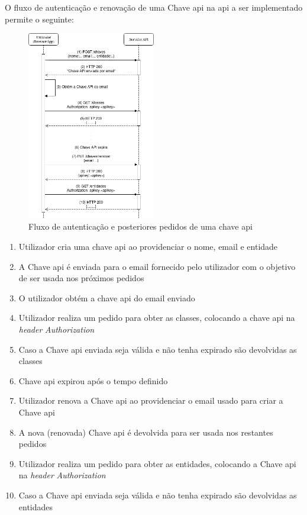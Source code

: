O fluxo de autenticação e renovação de uma Chave \acrshort{api} na \acrshort{api} a ser implementado permite o seguinte:
\begin{figure}[H]
    \centering
    \includegraphics[width=0.5\textwidth]{img/chaveAuth.png}
    \caption{Fluxo de autenticação e posteriores pedidos de uma chave \acrshort{api}}\label{fig:chaveAuth}
\end{figure}

\begin{enumerate}
    \item Utilizador cria uma chave \acrshort{api} ao providenciar o nome, email e entidade
    \item A Chave \acrshort{api} é enviada para o email fornecido pelo utilizador com o objetivo de ser usada nos próximos pedidos
    \item O utilizador obtém a chave \acrshort{api} do email enviado
    \item Utilizador realiza um pedido para obter as classes, colocando a chave \acrshort{api} na \textit{header} \textit{Authorization}
    \item Caso a Chave \acrshort{api} enviada seja válida e não tenha expirado são devolvidas as classes
    \item Chave \acrshort{api} expirou após o tempo definido
    \item Utilizador renova a Chave \acrshort{api} ao providenciar o email usado para criar a Chave \acrshort{api}
    \item A nova (renovada) Chave \acrshort{api} é devolvida para ser usada nos restantes pedidos
    \item Utilizador realiza um pedido para obter as entidades, colocando a Chave \acrshort{api} na \textit{header} \textit{Authorization}
    \item Caso a Chave \acrshort{api} enviada seja válida e não tenha expirado são devolvidas as entidades
\end{enumerate}

